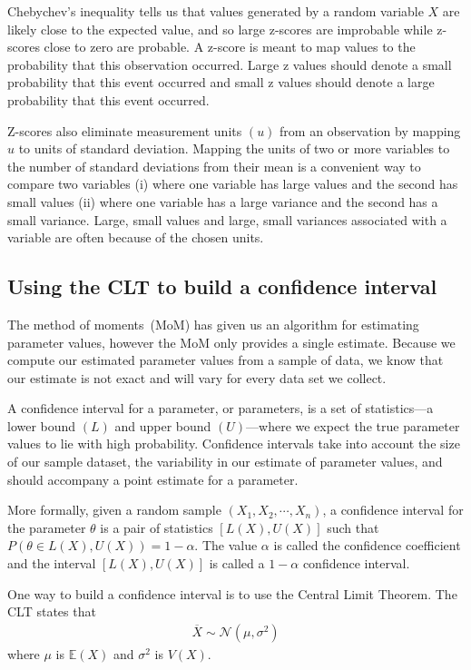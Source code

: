 Chebychev's inequality tells us that values generated by a random variable $X$ are likely close to the expected value, and so large z-scores are improbable while z-scores close to zero are probable.
A z-score is meant to map values to the probability that this observation occurred. Large z values should denote a small probability that this event occurred and small z values should denote a large probability that this event occurred.

Z-scores also eliminate measurement units $(u)$ from an observation by mapping $u$ to units of standard deviation. 
Mapping the units of two or more variables to the number of standard deviations from their mean is a convenient way to compare two variables (i) where one variable has large values and the second has small values (ii) where one variable has a large variance and the second has a small variance. 
Large, small values and large, small variances associated with a variable are often because of the chosen units. 




\subsection{Using the CLT to build a confidence interval}

The method of moments~(MoM) has given us an algorithm for estimating parameter values, however the MoM only provides a single estimate. 
Because we compute our estimated parameter values from a sample of data, we know that our estimate is not exact and will vary for every data set we collect.

A confidence interval for a parameter, or parameters, is a set of statistics---a lower bound $(L)$ and upper bound $(U)$---where we expect the true parameter values to lie with high probability. 
Confidence intervals take into account the size of our sample dataset, the variability in our estimate of parameter values, and should accompany a point estimate for a parameter.

\ex

More formally, given a random sample $(X_{1},X_{2},\cdots,X_{n})$,  a confidence interval for the parameter $\theta$ is a pair of statistics $[L(X), U(X)]$ such that $P(\theta \in {L(X),U(X)}) = 1-\alpha$. 
The value $\alpha$ is called the confidence coefficient and the interval $[L(X), U(X)]$ is called a $1-\alpha$ confidence interval.

One way to build a confidence interval is to use the Central Limit Theorem.
The CLT states that 
\begin{align}
    \overline{X} \sim \mathcal{N}\left( \mu, \sigma^{2} \right)
\end{align}
where $\mu$ is $\mathbb{E}(X)$ and $\sigma^{2}$ is $V(X)$. 

